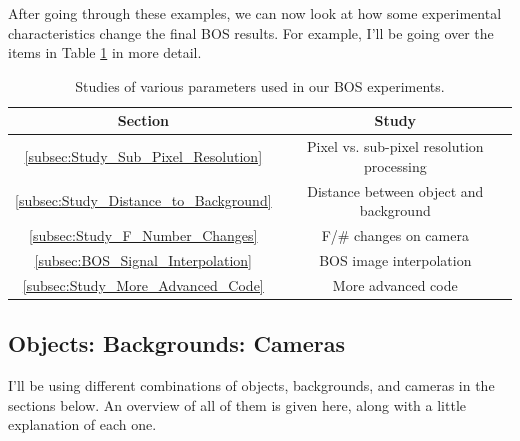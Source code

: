 \documentclass[letterpaper,12pt]{article}
\begin{document}
After going through these examples, we can now look at how some experimental characteristics change the final BOS results.  For example, I'll be going over the items in Table \ref{tab:Study_Cases} in more detail.

\begin{table}[H]
\setlength{\arrayrulewidth}{0.5mm}
\setlength{\tabcolsep}{12pt}
\renewcommand{\arraystretch}{1.5}
{
\begin{center}
\begin{tabular}{| c | c |}
\hline
\rowcolor{black}
\color{white} Section & \color{white} Study  \\[1ex]
\hline
\ref{subsec:Study_Sub_Pixel_Resolution}		& Pixel vs. sub-pixel resolution processing		\\
\ref{subsec:Study_Distance_to_Background}	& Distance between object and background		\\
\ref{subsec:Study_F_Number_Changes}			& F/\# changes on camera						\\
\ref{subsec:BOS_Signal_Interpolation}		& BOS image interpolation						\\
\ref{subsec:Study_More_Advanced_Code}		& More advanced code							\\\hline
\end{tabular}
\end{center}
}
\caption{Studies of various parameters used in our BOS experiments.}
\label{tab:Study_Cases}
\end{table}

\subsection{Objects: Backgrounds: Cameras}
\label{subsec:Objects_Backgrounds_Cameras}

I'll be using different combinations of objects, backgrounds, and cameras in the sections below.  An overview of all of them is given here, along with a little explanation of each one.
\end{document}
